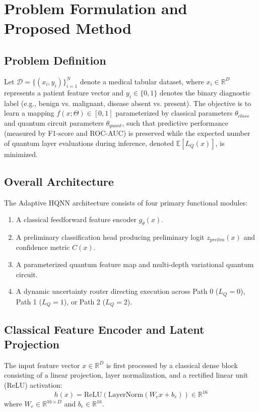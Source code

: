 \documentclass[conference]{IEEEtran}
\begin{document}
\section{Problem Formulation and Proposed Method}

\subsection{Problem Definition}
Let $\mathcal{D} = \{(x_i, y_i)\}_{i=1}^N$ denote a medical tabular dataset, where $x_i \in \mathbb{R}^D$ represents a patient feature vector and $y_i \in \{0, 1\}$ denotes the binary diagnostic label (e.g., benign vs. malignant, disease absent vs. present). The objective is to learn a mapping $f(x; \Theta) \in [0, 1]$ parameterized by classical parameters $\theta_{class}$ and quantum circuit parameters $\theta_{quant}$, such that predictive performance (measured by F1-score and ROC-AUC) is preserved while the expected number of quantum layer evaluations during inference, denoted $\mathbb{E}[L_Q(x)]$, is minimized.

\subsection{Overall Architecture}
The Adaptive HQNN architecture consists of four primary functional modules:
\begin{enumerate}
    \item A classical feedforward feature encoder $g_{\theta}(x)$.
    \item A preliminary classification head producing preliminary logit $z_{prelim}(x)$ and confidence metric $C(x)$.
    \item A parameterized quantum feature map and multi-depth variational quantum circuit.
    \item A dynamic uncertainty router directing execution across Path 0 ($L_Q = 0$), Path 1 ($L_Q = 1$), or Path 2 ($L_Q = 2$).
\end{enumerate}

\subsection{Classical Feature Encoder and Latent Projection}
The input feature vector $x \in \mathbb{R}^D$ is first processed by a classical dense block consisting of a linear projection, layer normalization, and a rectified linear unit (ReLU) activation:
\begin{equation}
h(x) = \text{ReLU}\left(\text{LayerNorm}\left(W_e x + b_e\right)\right) \in \mathbb{R}^{16}
\end{equation}
where $W_e \in \mathbb{R}^{16 \times D}$ and $b_e \in \mathbb{R}^{16}$.
\end{document}
